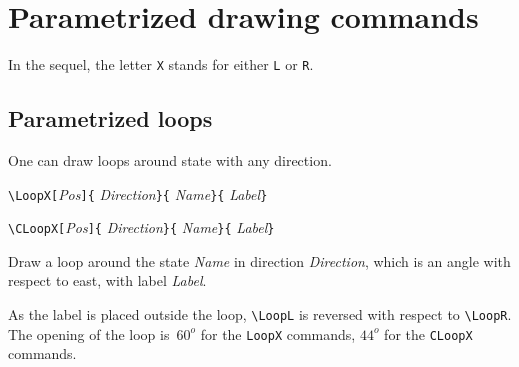 \documentclass[11pt,twoside]{article}
\newlength{\ColoText}%
\newlength{\ColoFigu}%
\newlength{\parindenttemp} %
\newcommand{\noi}{\noindent}
\newlength{\jsIndent}%
\begin{document}
\section{Parametrized drawing commands}\label{sec.par}

\noi
In the sequel, the letter \texttt{X} stands for either 
\texttt{L} or \texttt{R}.

\subsection{Parametrized loops}
One can draw loops around state with any direction.

\noi 
\hspace*{-\jsIndent}
\begin{minipage}[t]{\ColoText}
        \par\vspace*{0mm}%
\medskip 
        \footnotesize
\verb+\LoopX[+\textsl{Pos}\verb+]{+%
   \textsl{Direction}\verb+}{+%
   \textsl{Name}\verb+}{+%
   \textsl{Label}\verb+}+
   
\medskip 
\verb+\CLoopX[+\textsl{Pos}\verb+]{+%
   \textsl{Direction}\verb+}{+%
   \textsl{Name}\verb+}{+%
   \textsl{Label}\verb+}+
\end{minipage}%
\hspace*{1.2em}%
\begin{minipage}[t]{\ColoFigu}%
\par\vspace*{0mm}%
Draw a loop around the state {\sl Name} in direction {\sl Direction},
which is an angle with respect to east, with label {\sl Label}.

As the label 
is placed outside the loop, \verb+\LoopL+ is reversed
with respect to \verb+\LoopR+.
The opening of the loop is~$60^o$ for the \verb+LoopX+ commands,
$44^o$ for the \verb+CLoopX+ commands.
\end{minipage}%
\end{document}
